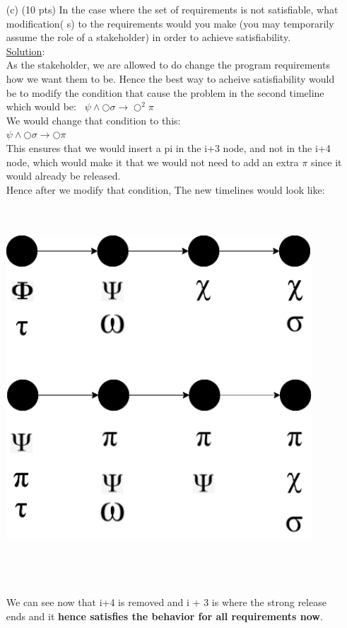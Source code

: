 \documentclass[12pt]{article}
\begin{document}
\begin{enumerate}
\begin{enumerate}
\item[(c)] (10 pts) In the case where the set of requirements is not satisfiable, what modification(
s) to the requirements would you make (you may temporarily assume the
role of a stakeholder) in order to achieve satisfiability. \\
\noindent \underline{Solution}:\\
As the stakeholder, we are allowed to do change the program requirements how we want them to be. Hence the best way to acheive satisfiability would be to modify the condition that cause the problem in the second timeline which would be: \
$\psi \wedge \bigcirc \sigma \rightarrow \bigcirc^2 \pi $ \\
We would change that condition to this: \\
$\psi \wedge \bigcirc \sigma \rightarrow \bigcirc \pi $ \\
This ensures that we would insert a pi in the i+3 node, and not in the i+4 node, which would make it that we would not need to add an extra $\pi$ since it would already be released. \\
Hence after we modify that condition, The new timelines would look like: \\ \\
\begin{minipage}{\linewidth}
   \centering
\includegraphics[width=0.9\textwidth, height = 12.5cm, keepaspectratio]{images/SOEN331_A4_Q6c.png} 
\end{minipage}
\\
\\
\noindent We can see now that i+4 is removed and i + 3 is where the strong release ends and it \textbf{hence satisfies the behavior for all requirements now}. \\


\end{enumerate}
\end{enumerate}
\end{document}
